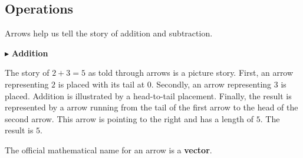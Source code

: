 \documentclass{ximera}
\begin{document}
\subsection{Operations} 


Arrows help us tell the story of addition and subtraction.



$\blacktriangleright$ \textbf{Addition}


The story of $2+3=5$ as told through arrows is a picture story.  First, an arrow representing $2$ is placed with its tail at $0$.  Secondly, an arrow representing $3$ is placed.  Addition is illustrated by a head-to-tail placement.  Finally, the result is represented by a arrow running from the tail of the first arrow to the head of the second arrow. This arrow is pointing to the right and has a length of $5$.  The result is $5$.




  \begin{image}
  \end{image}





The official mathematical name for an arrow is a \textbf{\textcolor{purple!85!blue}{vector}}.
\end{document}
